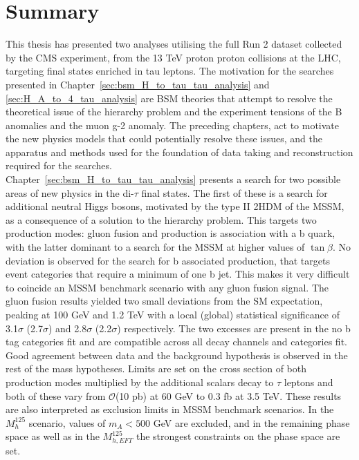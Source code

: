 \section{Summary}

This thesis has presented two analyses utilising the full Run 2 dataset collected by the \ac{CMS} experiment, from the 13 TeV proton proton collisions at the \ac{LHC}, targeting final states enriched in tau leptons.
The motivation for the searches presented in Chapter~\ref{sec:bsm_H_to_tau_tau_analysis} and \ref{sec:H_A_to_4_tau_analysis} are \ac{BSM} theories that attempt to resolve the theoretical issue of the hierarchy problem and the experiment tensions of the B anomalies and the muon g-2 anomaly.
The preceding chapters, act to motivate the new physics models that could potentially resolve these issues, and the apparatus and methods used for the foundation of data taking and reconstruction required for the searches. \\

Chapter~\ref{sec:bsm_H_to_tau_tau_analysis} presents a search for two possible areas of new physics in the di-$\tau$ final states.
The first of these is a search for additional neutral Higgs bosons, motivated by the type II \ac{2HDM} of the \ac{MSSM}, as a consequence of a solution to the hierarchy problem.
This targets two production modes: gluon fusion and production is association with a b quark, with the latter dominant to a search for the \ac{MSSM} at higher values of $\tan\beta$.
No deviation is observed for the search for b associated production, that targets event categories that require a minimum of one b jet.
This makes it very difficult to coincide an \ac{MSSM} benchmark scenario with any gluon fusion signal.
The gluon fusion results yielded two small deviations from the \ac{SM} expectation, peaking at 100 GeV and 1.2 TeV with a local (global) statistical significance of 3.1$\sigma$ (2.7$\sigma$) and 2.8$\sigma$ (2.2$\sigma$) respectively.
The two excesses are present in the no b tag categories fit and are compatible across all decay channels and categories fit.
Good agreement between data and the background hypothesis is observed in the rest of the mass hypotheses.
Limits are set on the cross section of both production modes multiplied by the additional scalars decay to $\tau$ leptons and both of these vary from $\mathcal{O}$(10 pb) at 60 GeV to 0.3 fb at 3.5 TeV.
These results are also interpreted as exclusion limits in \ac{MSSM} benchmark scenarios.
In the $M_{h}^{125}$ scenario, values of $m_A < 500$ GeV are excluded, and in the remaining phase space as well as in the $M_{h, EFT}^{125}$ the strongest constraints on the phase space are set. \\

